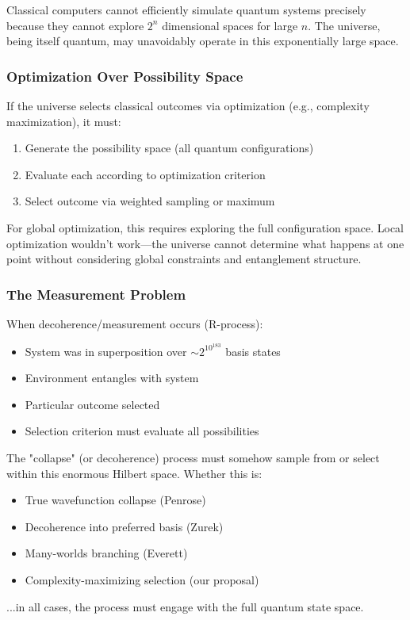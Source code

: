 ﻿\documentclass{article}
\begin{document}
Classical computers cannot efficiently simulate quantum systems precisely because they cannot explore $2^n$ dimensional spaces for large $n$. The universe, being itself quantum, may unavoidably operate in this exponentially large space.


\subsubsection{Optimization Over Possibility Space}


If the universe selects classical outcomes via optimization (e.g., complexity maximization), it must:
\begin{enumerate}
\item Generate the possibility space (all quantum configurations)
\item Evaluate each according to optimization criterion
\item Select outcome via weighted sampling or maximum
\end{enumerate}


For global optimization, this requires exploring the full configuration space. Local optimization wouldn't work—the universe cannot determine what happens at one point without considering global constraints and entanglement structure.


\subsubsection{The Measurement Problem}


When decoherence/measurement occurs (R-process):
\begin{itemize}
\item System was in superposition over $\sim 2^{10^{183}}$ basis states
\item Environment entangles with system
\item Particular outcome selected
\item Selection criterion must evaluate all possibilities
\end{itemize}


The "collapse" (or decoherence) process must somehow sample from or select within this enormous Hilbert space. Whether this is:
\begin{itemize}
\item True wavefunction collapse (Penrose)
\item Decoherence into preferred basis (Zurek)
\item Many-worlds branching (Everett)
\item Complexity-maximizing selection (our proposal)
\end{itemize}
...in all cases, the process must engage with the full quantum state space.
\end{document}
